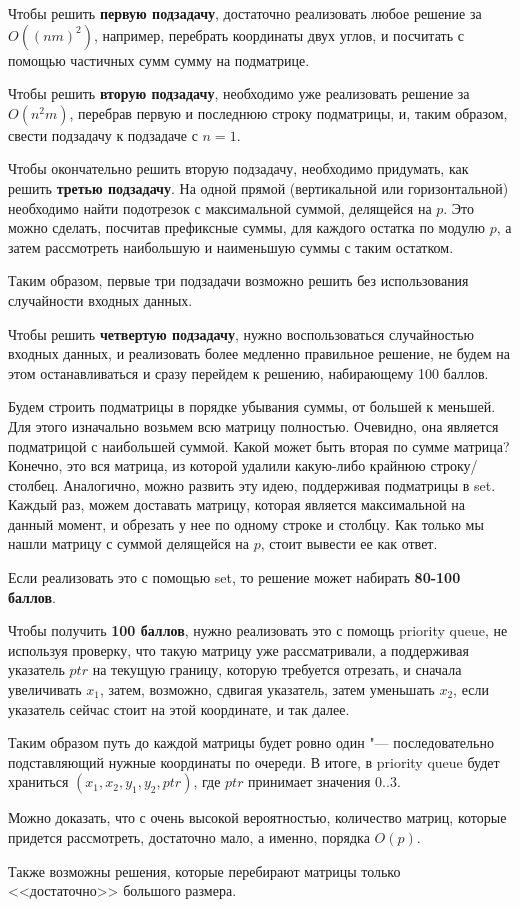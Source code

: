 Чтобы решить \textbf{первую подзадачу}, достаточно реализовать любое решение за $O((nm)^2)$, например, перебрать координаты двух углов, и посчитать с помощью частичных сумм сумму на подматрице.

Чтобы решить \textbf{вторую подзадачу}, необходимо уже реализовать решение за $O(n^2m)$, перебрав первую и последнюю строку подматрицы, и, таким образом, свести подзадачу к подзадаче с $n=1$.

Чтобы окончательно решить вторую подзадачу, необходимо придумать, как решить \textbf{третью подзадачу}. На одной прямой (вертикальной или горизонтальной) необходимо найти подотрезок с максимальной суммой, делящейся на $p$. Это можно сделать, посчитав префиксные суммы, для каждого остатка по модулю $p$, а затем рассмотреть наибольшую и наименьшую суммы с таким остатком.

Таким образом, первые три подзадачи возможно решить без использования случайности входных данных.

Чтобы решить \textbf{четвертую подзадачу}, нужно воспользоваться случайностью входных данных, и реализовать более медленно правильное решение, не будем на этом останавливаться и сразу перейдем к решению, набирающему 100 баллов.

Будем строить подматрицы в порядке убывания суммы, от большей к меньшей. Для этого изначально возьмем всю матрицу полностью. Очевидно, она является подматрицой с наибольшей суммой. Какой может быть вторая по сумме матрица? Конечно, это вся матрица, из которой удалили какую-либо крайнюю строку/столбец. Аналогично, можно развить эту идею, поддерживая подматрицы в set. Каждый раз, можем доставать матрицу, которая является максимальной на данный момент, и обрезать у нее по одному строке и столбцу. Как только мы нашли матрицу с суммой делящейся на $p$, стоит вывести ее как ответ. 

Если реализовать это с помощью set, то решение может набирать \textbf{80-100 баллов}.

Чтобы получить \textbf{100 баллов}, нужно реализовать это с помощь priority queue, не используя проверку, что  такую матрицу уже рассматривали, а поддерживая указатель $ptr$ на текущую границу, которую требуется отрезать, и сначала увеличивать $x_1$, затем, возможно, сдвигая указатель, затем уменьшать $x_2$, если указатель сейчас стоит на этой координате, и так далее. 

Таким образом путь до каждой матрицы будет ровно один "--- последовательно подставляющий нужные координаты по очереди.
В итоге, в priority queue будет храниться $(x_1, x_2, y_1, y_2, ptr)$, где $ptr$ принимает значения $0..3$. 

Можно доказать, что с очень высокой вероятностью, количество матриц, которые придется рассмотреть, достаточно мало, а именно, порядка $O(p)$.

Также возможны решения, которые перебирают матрицы только <<достаточно>> большого размера.